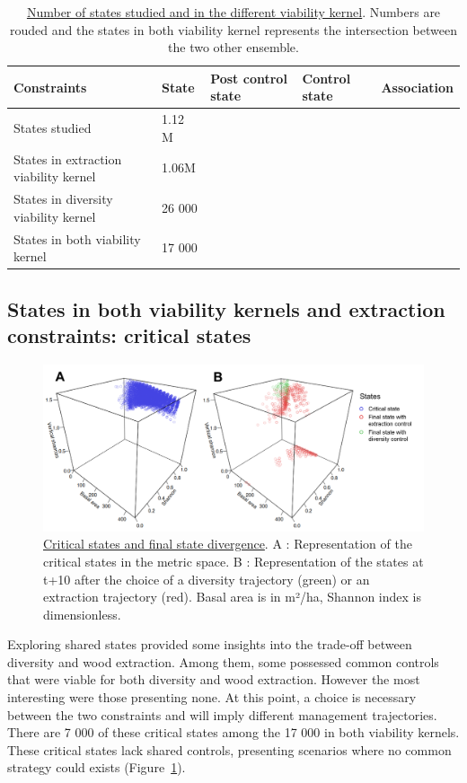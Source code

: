 \documentclass{article}
\begin{document}
\begin{table}[t]
    \centering
    \begin{tabular}{l l l l l}
    \hline
    \hline
    \textbf{Constraints} & \textbf{State} & \textbf{Post control state} & \textbf{Control state} & \textbf{Association} \\
    \hline
    States studied & 1.12 M \\
    States in extraction viability kernel & 1.06M \\
    States in diversity viability kernel  & 26 000 \\
    States in both viability kernel & 17 000 \\
    \hline
    \hline
    \end{tabular}
    \caption{\underline{Number of states studied and in the different viability kernel}. Numbers are rouded and the states in both viability kernel represents the intersection between the two other ensemble.}
    \label{tab:Viability_kernel}
\end{table}

\subsection{States in both viability kernels and extraction constraints: critical states}

\begin{figure}[h!]
    \centering
    \includegraphics[width=\textwidth]{Figure/Results/Criticals_states.png}
    \caption{\underline{Critical states and final state divergence}. A : Representation of the critical states in the metric space. B : Representation of the states at t+10 after the choice of a diversity trajectory (green) or an extraction trajectory (red). Basal area is in m²/ha, Shannon index is dimensionless.}
    \label{fig:Criticals_states}
\end{figure}

Exploring shared states provided some insights into the trade-off between diversity and wood extraction. Among them, some possessed common controls that were viable for both diversity and wood extraction. However the most interesting were those presenting none. At this point, a choice is necessary between the two constraints and will imply different management trajectories. There are 7 000 of these critical states among the 17 000 in both viability kernels. These critical states lack shared controls, presenting scenarios where no common strategy could exists (Figure~\ref{fig:Criticals_states}).
\end{document}
